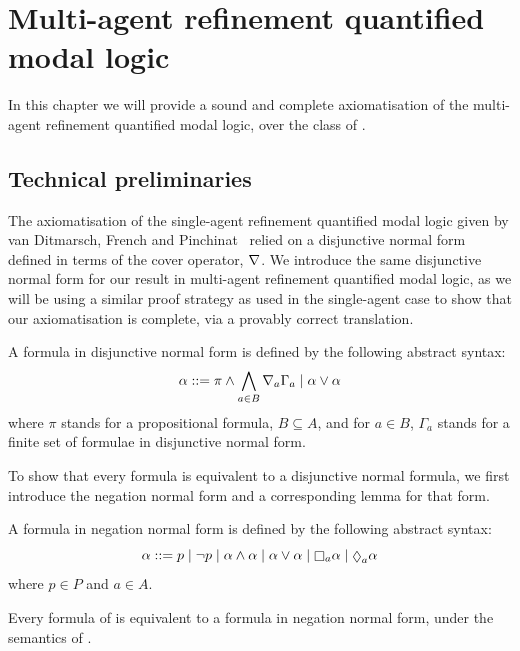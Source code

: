 \chapter{Multi-agent refinement quantified modal logic}\label{k}

In this chapter we will provide a sound and complete axiomatisation of the
multi-agent refinement quantified modal logic, over the class of \classK{}. 

\section{Technical preliminaries}

The axiomatisation of the single-agent refinement quantified modal logic given
by van Ditmarsch, French and Pinchinat~\cite{french2010future} relied on a
disjunctive normal form defined in terms of the cover operator, $\nabla$. We
introduce the same disjunctive normal form for our result in multi-agent
refinement quantified modal logic, as we will be using a similar proof strategy
as used in the single-agent case to show that our axiomatisation is complete,
via a provably correct translation.

\begin{definition}
A formula in disjunctive normal form is defined by the following abstract syntax:
$$
\alpha ::= \pi \land \bigwedge_{a \in B} \nabla_a \Gamma_a \mid \alpha \lor \alpha
$$
where $\pi$ stands for a propositional formula, $B \subseteq A$, and for $a \in
B$, $\Gamma_a$ stands for a finite set of formulae in disjunctive normal form.
\end{definition}

To show that every \lang{} formula is equivalent to a disjunctive normal
formula, we first introduce the negation normal form and a corresponding lemma
for that form.

\begin{definition}
A formula in negation normal form is defined by the following abstract syntax:
$$
\alpha ::= p \bnfalt 
\neg p \bnfalt
\alpha \land \alpha \bnfalt
\alpha \lor \alpha \bnfalt
\knows_a \alpha \bnfalt
\suspects_a \alpha
$$
where $p \in P$ and $a \in A$.
\end{definition}

\begin{lemma}\label{k-nnf}
Every formula of \lang{} is equivalent to a formula in negation normal form,
under the semantics of \logicK{}.
\end{lemma}

